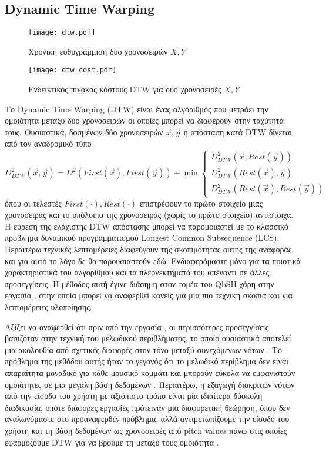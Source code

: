 \subsection{Dynamic Time Warping}\label{sub:DTW}
\begin{figure}[htb]
	\centering
	\texttt{[image: dtw.pdf]}
	\caption{Χρονική ευθυγράμμιση δύο χρονοσειρών $X, Y$}
\end{figure}
\begin{figure}
	\centering
	\texttt{[image: dtw\_cost.pdf]}
	\caption{Ενδεικτικός πίνακας κόστους DTW για δύο χρονοσειρές $X, Y$}
\end{figure}
Το Dynamic Time Warping (DTW) είναι ένας αλγόριθμός που μετράει την ομοιότητα
μεταξύ δύο χρονοσειρών οι οποίες μπορεί να διαφέρουν στην ταχύτητά τους.
Ουσιαστικά, δοσμένων δύο χρονοσειρών $\vec x, \vec y$ η απόσταση κατά DTW
δίνεται από τον αναδρομικό τύπο
$$
D^2_{DTW} \left(\vec x, \vec y\right) = D^2 \left(First \left(\vec x\right), First \left(\vec y\right)\right) + \min \begin{cases} D^2_{DTW} \left(\vec x, Rest \left(\vec y\right)\right) \\
 D^2_{DTW} \left(Rest \left(\vec x\right),\vec y\right) \\
 D^2_{DTW} \left(Rest \left(\vec x\right), Rest \left(\vec y\right)\right) \end{cases}
$$
όπου οι τελεστές $First \left( \cdot\right), Rest \left( \cdot\right)$
επιστρέφουν το πρώτο στοιχείο μιας χρονοσειράς και το υπόλοιπο της χρονοσειράς
(χωρίς το πρώτο στοιχείο) αντίστοιχα.
Η εύρεση της ελάχιστης DTW απόστασης μπορεί να παρομοιαστεί με το κλασσικό
πρόβλημα δυναμικού προγραμματισμού Longest Common Subsequence (LCS).
Περαιτέρω τεχνικές λεπτομέρειες διαφεύγουν της σκοπιμότητας αυτής της αναφοράς,
και για αυτό το λόγο δε θα παρουσιαστούν εδώ.
Ενδιαφερόμαστε μόνο για τα ποιοτικά χαρακτηριστικά του αλγορίθμου και τα
πλεονεκτήματά του απέναντι σε άλλες προσεγγίσεις.
Η μέθοδος αυτή έγινε διάσημη στον τομέα του QbSH χάρη στην εργασία
\cite{Zhu:2003:WIE:872757.872780}, στην  οποία μπορεί να αναφερθεί κανείς για
μια πιο τεχνική σκοπιά και για λεπτομέρειες υλοποίησης.

Αξίζει να αναφερθεί ότι πριν από την εργασία \cite{Zhu:2003:WIE:872757.872780},
οι περισσότερες προσεγγίσεις βασιζόταν στην τεχνική του μελωδικού περιβλήματος,
το οποίο ουσιαστικά αποτελεί μια ακολουθία από σχετικές διαφορές στον τόνο
μεταξύ συνεχόμενων νότων \cite{Ghias:1995:QHM:217279.215273}.
Το πρόβλημα της μεθόδου αυτής ήταν το γεγονός ότι το μελωδικό περίβλημα δεν
είναι απαραίτητα μοναδικό για κάθε μουσικό κομμάτι και μπορούν εύκολα να
εμφανιστούν ομοιότητες σε μια μεγάλη βάση δεδομένων
\cite{Uitdenbogerd:1998:MMM:290747.290776}.
Περαιτέρω, η εξαγωγή διακριτών νότων από την είσοδο του χρήστη με αξιόπιστο
τρόπο είναι μία ιδιαίτερα δύσκολη διαδικασία, οπότε διάφορες εργασίες πρότειναν
μια διαφορετική θεώρηση, όπου δεν αναλωνόμαστε στο προαναφερθέν πρόβλημα, αλλά
αντιμετωπίζουμε την είσοδο του χρήστη και τη βάση δεδομένων ως χρονοσειρές από
pitch values πάνω στις οποίες εφαρμόζουμε DTW για να βρούμε τη μεταξύ τους
ομοιότητα \cite{Jang:2001:HFM:500141.500201,mazzoni2001melody}.

